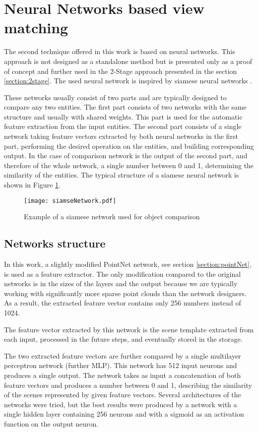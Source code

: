 \section{Neural Networks based view matching}\label{section:nnMatching}

The second technique offered in this work is based on neural networks. This approach is not designed as a standalone method but is presented only as a proof of concept and further used in the 2-Stage approach presented in the section \ref{section:2stage}. The used neural network is inspired by siamese neural networks \cite{siamese}.\par
These networks usually consist of two parts and are typically designed to compare any two entities. The first part consists of two networks with the same structure and usually with shared weights. This part is used for the automatic feature extraction from the input entities. The second part consists of a single network taking feature vectors extracted by both neural networks in the first part, performing the desired operation on the entities, and building corresponding output. In the case of comparison network is the output of the second part, and therefore of the whole network, a single number between 0 and 1, determining the similarity of the entities. The typical structure of a siamese neural network is shown in Figure \ref{fig:siamseNetwork}.

\begin{figure}[htpb]
    \centering
    \texttt{[image: siamseNetwork.pdf]}
    \caption{Example of a siamese network used for object comparison} \label{fig:siamseNetwork}
\end{figure}

\subsection{Networks structure}

In this work, a slightly modified PointNet network, see section \ref{section:pointNet}, is used as a feature extractor. The only modification compared to the original networks is in the sizes of the layers and the output because we are typically working with significantly more sparse point clouds than the network designers. As a result, the extracted feature vector contains only 256 numbers instead of 1024.\par
The feature vector extracted by this network is the scene template extracted from each input, processed in the future steps, and eventually stored in the storage.\par
The two extracted feature vectors are further compared by a single multilayer perceptron network (further MLP). This network has 512 input neurons and produces a single output. The network takes as input a concatenation of both feature vectors and produces a number between 0 and 1, describing the similarity of the scenes represented by given feature vectors. Several architectures of the networks were tried, but the best results were produced by a network with a single hidden layer containing 256 neurons and with a sigmoid as an activation function on the output neuron.

